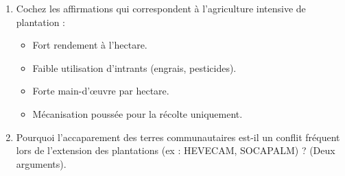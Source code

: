 \documentclass[11pt]{article}
\begin{document}
\begin{exercice}
\begin{enumerate}
    \item Cochez les affirmations qui correspondent à l'agriculture intensive de plantation :
    \begin{itemize}
        \item[$\square$] Fort rendement à l'hectare.
        \item[$\square$] Faible utilisation d'intrants (engrais, pesticides).
        \item[$\square$] Forte main-d'œuvre par hectare.
        \item[$\square$] Mécanisation poussée pour la récolte uniquement.
    \end{itemize}
    \item Pourquoi l'accaparement des terres communautaires est-il un conflit fréquent lors de l'extension des plantations (ex : HEVECAM, SOCAPALM) ? (Deux arguments).
\end{enumerate}
\end{exercice}
\end{document}
